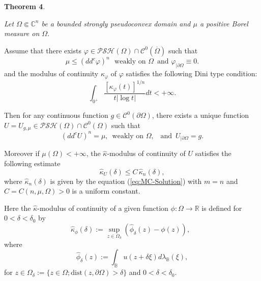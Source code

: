 \documentclass[12pt]{amsart}
\theoremstyle{definition}
\numberwithin{theorem}{section}
\numberwithin{equation}{section}
\newcommand{\B}{\mathbb{B}}
\newcommand{\R}{\mathbb{R}}
\newcommand{\C}{\mathbb{C}}
\begin{document}
 {\bf Theorem 4}. { \it Let $\Omega \Subset \C^n$ be a  bounded strongly pseudoconvex  domain and $\mu $ a positive Borel measure on $\Omega$. 
 
 Assume that there exists $\varphi\in \mathcal{PSH} (\Omega)\cap\mathcal{C}^{0}(\overline\Omega)$ such that  
\begin{equation} \label{eq:subsol1}
 \mu \leq (dd^c\varphi)^n\, \, \, \, \mathrm{weakly \, \, on} \, \,  \Omega \, \, \, \mathrm{and} \, \, \varphi_{\mid  \partial \Omega} \equiv 0.
\end{equation} 
 and  the modulus of continuity $\kappa_\varphi$ of $\varphi$ satisfies the following Dini type condition:
 \begin{equation} \label{eq:DC2}
 \int_{0^+} \frac{\left[\kappa_\varphi (t)\right]^{1 \slash n}}{t \vert \log t \vert} d t< + \infty. 
 \end{equation}


 Then for any continuous function $g \in \mathcal{C}^{0} (\partial \Omega)$, there exists a unique function $U = U_{g,\mu} \in \mathcal{PSH} (\Omega) \cap  \mathcal{C}^0 ({\Omega})$ such that  
 $$
 (dd^c U)^n  = \mu, \, \, \, \mathrm{weakly \, \, on} \, \,  \Omega, \, \,  \, \, \, \mathrm{and} \, \, \, U_{\mid  \partial \Omega}  = g.
 $$
 
 
 Moreover if $\mu (\Omega) < + \infty$, the $\widehat{\kappa}$-modulus of continuity of $U$ satisfies the following estimate 
$$
\widehat{\kappa}_U (\delta) \leq C  \, \widehat{\kappa}_n (\delta),
$$ 
where  $\widehat{\kappa}_n (\delta)$ is given by the equation (\ref{eq:MC-Solution}) with $m = n$ and $C = C(n, \mu,\Omega) > 0$ is a uniform constant.} 
 
  
 \smallskip
 \smallskip
 
 Here the $\widehat{\kappa}$-modulus of continuity of  a given function $\phi:\Omega \longrightarrow \R$ is defined for $0 < \delta <\delta_0$  by
 \begin{equation}
\widehat{\kappa}_{\phi} (\delta) := \sup_{z \in \Omega_{\delta}} (\widehat{\phi}_\delta (z) - \phi (z)), \, \, \, 
\end{equation}
where
\begin{equation} 
\widehat{\phi}_\delta (z) := \int_{\B} u (z + \delta \xi) d \lambda_{\B} (\xi), 
\end{equation} 
for $z \in \Omega_\delta := \{z \in \Omega ; \text{dist} (z,\partial \Omega) > \delta \}$ and $0 < \delta < \delta_0$.

 
  \smallskip
 \smallskip
\end{document}
